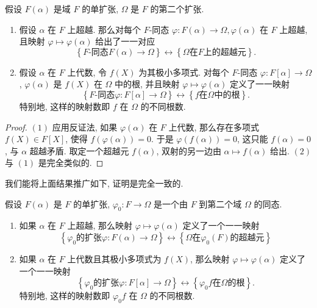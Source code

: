 \begin{proposition}
  \label{proposition-simple-extension-and-field-homomorphism}
  假设 \( F(\alpha) \) 是域 \( F \) 的单扩张, \( \Omega \) 是 \( F \)
  的第二个扩张.
  \begin{enumerate}
    \item 假设 \( \alpha \) 在 \( F \) 上超越. 那么对每个 \( F \)-同态 \(
      \varphi: F(\alpha) \to \Omega, \varphi(\alpha) \) 在 \( F \) 上超越,
      且映射 \( \varphi \mapsto \varphi(\alpha) \) 给出了一一对应
      \[
        \left\lbrace F\text{-同态} F(\alpha) \to \Omega \right\rbrace
        \leftrightarrow \left\lbrace \Omega \text{在} F \text{上的超越元}
        \right\rbrace.
      \]
    \item 假设 \( \alpha \) 在 \( F \) 上代数, 令 \( f(X) \) 为其极小多项式.
      对每个 \( F \)-同态 \( \varphi: F[\alpha] \to \Omega \), \(
      \varphi(\alpha) \) 是 \( f(X) \) 在 \( \Omega \) 中的根, 并且映射 \(
      \varphi \mapsto \varphi(\alpha) \) 定义了一一映射
      \[
        \left\lbrace F \text{-同态} \varphi: F[\alpha] \to \Omega \right\rbrace
        \leftrightarrow \left\lbrace f \text{在} \Omega \text{中的根}
        \right\rbrace.
      \]
      特别地, 这样的映射数即 \( f \) 在 \( \Omega \) 的不同根数.
  \end{enumerate}
\end{proposition}
\begin{proof}
  \( (1) \)
  应用反证法, 如果 \( \varphi(\alpha) \) 在 \( F \) 上代数, 那么存在多项式 \(
  f(X) \in F[X] \), 使得 \( f(\varphi(\alpha)) = 0 \).
  于是 \( \varphi(f(\alpha)) = 0 \), 这只能 \( f(\alpha) = 0 \), 与 \( \alpha \)
  超越矛盾.
  取定一个超越元 \( f(\alpha) \), 双射的另一边由 \( \alpha \mapsto f(\alpha) \)
  给出.
  \( (2) \)
  与 \( (1) \) 是完全类似的.
\end{proof}

我们能将上面结果推广如下, 证明是完全一致的.
\begin{proposition}
  \label{proposition-extended-simple-extension-and-field-homomorphism}
  假设 \( F(\alpha) \) 是 \( F \) 的单扩张, \( \varphi_0: F \to \Omega \)
  是一个由 \( F \) 到第二个域 \( \Omega \) 的同态.
  \begin{enumerate}
    \item 如果 \( \alpha \) 在 \( F \) 上超越, 那么映射 \( \varphi \mapsto
      \varphi(\alpha) \) 定义了一个一一映射
      \[
        \left\lbrace \varphi_0 \text{的扩张} \varphi: F(\alpha) \to \Omega
        \right\rbrace \leftrightarrow \left\lbrace \Omega \text{在} \varphi_0(F)
        \text{的超越元} \right\rbrace
      \]
    \item 如果 \( \alpha \) 在 \( F \) 上代数且其极小多项式为 \( f(X) \),
      那么映射 \( \varphi \mapsto \varphi(\alpha) \) 定义了一个一一映射
      \[
        \left\lbrace \varphi_0 \text{的扩张} \varphi: F[\alpha] \to \Omega
        \right\rbrace \leftrightarrow \left\lbrace \varphi_0 f \text{在} \Omega
        \text{的根} \right\rbrace.
      \]
      特别地, 这样的映射数即 \( \varphi_0f \) 在 \( \Omega \) 的不同根数.
  \end{enumerate}
\end{proposition}

